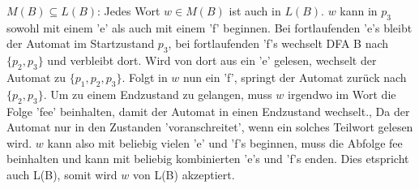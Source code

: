 \documentclass{article}
\begin{document}
$M(B) \subseteq L(B)$: Jedes Wort $w \in M(B)$ ist auch in $L(B)$. $w$ kann in
$p_3$ sowohl mit einem 'e' als auch mit einem 'f' beginnen. Bei fortlaufenden
'e's bleibt der Automat im Startzustand $p_3$, bei fortlaufenden 'f's wechselt
DFA B nach $\{p_2, p_3\}$ und verbleibt dort. Wird von dort aus ein 'e' gelesen,
wechselt der Automat zu $\{p_1, p_2, p_3\}$. Folgt in $w$ nun ein 'f', springt
der Automat zurück nach $\{p_2, p_3\}$. Um zu einem Endzustand zu gelangen, muss
$w$ irgendwo im Wort die Folge 'fee' beinhalten, damit der Automat in einen
Endzustand wechselt., Da der Automat nur in den Zustanden 'voranschreitet', wenn
ein solches Teilwort gelesen wird. $w$ kann also mit beliebig vielen 'e' und
'f's beginnen, muss die Abfolge {fee} beinhalten und kann mit beliebig
kombinierten 'e's und 'f's enden. Dies etspricht auch L(B), somit wird $w$ von
L(B) akzeptiert.


 
\end{document}
